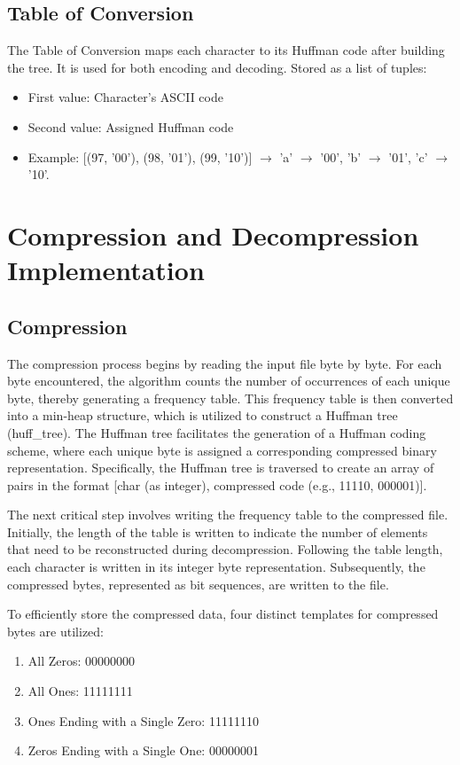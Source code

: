 \documentclass[12pt,oneside,letterpaper,english]{article}
\begin{document}
\subsection*{Table of Conversion}
The Table of Conversion maps each character to its Huffman code after building the tree. It is used for both encoding and decoding.
Stored as a list of tuples:
\begin{itemize}
    \item 
        First value: Character's ASCII code
    \item
        Second value: Assigned Huffman code
    \item
        Example: [(97, '00'), (98, '01'), (99, '10')] $\rightarrow$ 'a' $\rightarrow$ '00', 'b' $\rightarrow$ '01', 'c' $\rightarrow$ '10'.
\end{itemize}

\section{Compression and Decompression Implementation}
\subsection*{Compression}
The compression process begins by reading the input file byte by byte. For each byte encountered, the algorithm counts the number of occurrences of each unique byte, thereby generating a frequency table. This frequency table is then converted into a min-heap structure, which is utilized to construct a Huffman tree (huff\_tree). The Huffman tree facilitates the generation of a Huffman coding scheme, where each unique byte is assigned a corresponding compressed binary representation. Specifically, the Huffman tree is traversed to create an array of pairs in the format [char (as integer), compressed code (e.g., 11110, 000001)].

The next critical step involves writing the frequency table to the compressed file. Initially, the length of the table is written to indicate the number of elements that need to be reconstructed during decompression. Following the table length, each character is written in its integer byte representation. Subsequently, the compressed bytes, represented as bit sequences, are written to the file.

To efficiently store the compressed data, four distinct templates for compressed bytes are utilized:
\begin{enumerate}
    \item All Zeros: 00000000
    \item All Ones: 11111111
    \item Ones Ending with a Single Zero: 11111110
    \item Zeros Ending with a Single One: 00000001
\end{enumerate}
\end{document}
